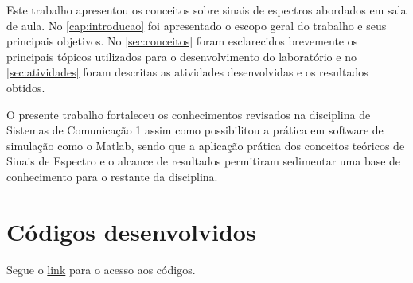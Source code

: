 \documentclass[11pt]{classes/ifscarticle}
\begin{document}
Este trabalho apresentou os conceitos sobre sinais de espectros abordados em sala de aula. No \autoref{cap:introducao} foi apresentado o escopo geral do trabalho e seus principais objetivos. No \autoref{sec:conceitos} foram esclarecidos brevemente os principais tópicos utilizados para o desenvolvimento do laboratório e no \autoref{sec:atividades} foram descritas as atividades desenvolvidas e os resultados obtidos.

O presente trabalho fortaleceu os conhecimentos revisados na disciplina de Sistemas de Comunicação 1 assim como possibilitou a prática em software de simulação como o Matlab, sendo que a aplicação prática dos conceitos teóricos de Sinais de Espectro e o alcance de resultados permitiram sedimentar uma base de conhecimento para o restante da disciplina.


\section{Códigos desenvolvidos}
\label{sec:code_dev}

Segue o \href{https://github.com/sarom-torres/COM1/tree/master/AT-2020.2/Codigos_AE1}{link}
 para o acesso aos códigos.



%
\end{document}
